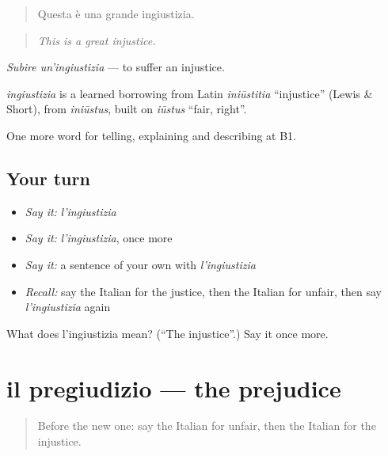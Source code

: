 \begin{quote}
Questa è una grande ingiustizia.
\end{quote}

\begin{quote}
\emph{This is a great injustice.}
\end{quote}

\emph{Subire un'ingiustizia} — to suffer an injustice.

\begin{cousinweb}
\emph{ingiustizia} is a learned borrowing from Latin \emph{iniūstitia} \textquotedblleft{}injustice\textquotedblright{} (Lewis \& Short), from \emph{iniūstus}, built on \emph{iūstus} \textquotedblleft{}fair, right\textquotedblright{}.
\end{cousinweb}

\begin{grammarlens}[title={What you've built}]
One more word for telling, explaining and describing at B1.
\end{grammarlens}

\subsection*{Your turn}
\begin{itemize}
\raggedright
  \item \emph{Say it:} \emph{l'ingiustizia}
  \item \emph{Say it:} \emph{l'ingiustizia}, once more
  \item \emph{Say it:} a sentence of your own with \emph{l'ingiustizia}
  \item \emph{Recall:} say the Italian for the justice, then the Italian for unfair, then say \emph{l'ingiustizia} again
\end{itemize}

\begin{tcolorbox}[breakable,colback=teal!4,colframe=teal!35!black,title={Before you move on}]
What does l'ingiustizia mean? (\textquotedblleft{}The injustice\textquotedblright{}.) Say it once more.
\end{tcolorbox}
\section[il pregiudizio]{il pregiudizio — the prejudice}

\label{lesson:IT-C365-pregiudizio}



\begin{quote}
Before the new one: say the Italian for unfair, then the Italian for the injustice.
\end{quote}

